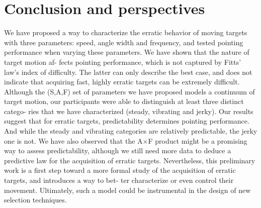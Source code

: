 \section{Conclusion and perspectives}
We have proposed a way to characterize the erratic behavior of moving targets with
three parameters: speed, angle width and frequency, and tested pointing performance
when varying these parameters. We have shown that the nature of target motion af-
fects pointing performance, which is not captured by Fitts’ law’s index of difficulty.
The latter can only describe the best case, and does not indicate that acquiring fast,
highly erratic targets can be extremely difficult.
Although the (S,A,F) set of parameters we have proposed models a continuum of
target motion, our participants were able to distinguish at least three distinct catego-
ries that we have characterized (steady, vibrating and jerky). Our results suggest that
for erratic targets, predictability determines pointing performance. And while the
steady and vibrating categories are relatively predictable, the jerky one is not.
We have also observed that the A×F product might be a promising way to assess
predictability, although we still need more data to deduce a predictive law for the
acquisition of erratic targets. Nevertheless, this preliminary work is a first step toward
a more formal study of the acquisition of erratic targets, and introduces a way to bet-
ter characterize or even control their movement. Ultimately, such a model could be
instrumental in the design of new selection techniques.


\clearpage
